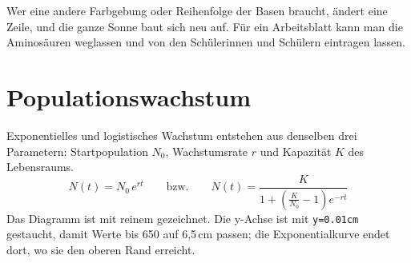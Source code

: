 \begin{ausgabe}
\begin{passend}
%
\end{passend}
\end{ausgabe}


Wer eine andere Farbgebung oder Reihenfolge der Basen braucht, ändert eine Zeile, und die ganze Sonne baut sich neu auf. Für ein Arbeitsblatt kann man die Aminosäuren weglassen und von den Schülerinnen und Schülern eintragen lassen.



\section{Populationswachstum}

Exponentielles und logistisches Wachstum entstehen aus denselben drei Parametern: Startpopulation $N_0$, Wachstumsrate $r$ und Kapazität $K$ des Lebensraums.
\[
	N(t) = N_0\,e^{rt} \qquad\text{bzw.}\qquad N(t) = \frac{K}{1 + \left(\frac{K}{N_0} - 1\right)e^{-rt}}
\]
Das Diagramm ist mit reinem \TikZ gezeichnet. Die y-Achse ist mit \texttt{y=0.01cm} gestaucht, damit Werte bis 650 auf 6,5\,cm passen; die Exponentialkurve endet dort, wo sie den oberen Rand erreicht.

